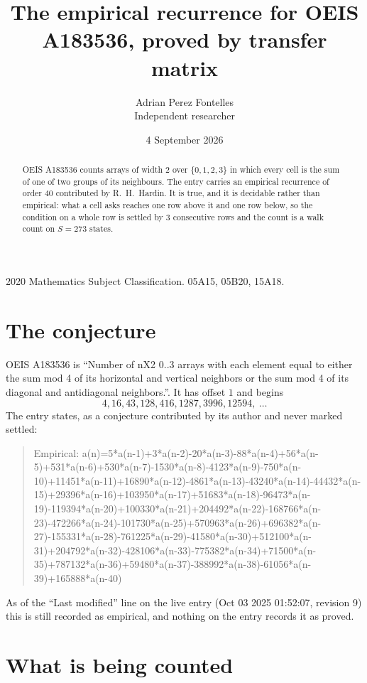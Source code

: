 \documentclass[11pt,a4paper]{article}
\title{The empirical recurrence for OEIS A183536, proved by transfer matrix}
\author{Adrian Perez Fontelles\\ \small Independent researcher}
\date{4 September 2026}
\theoremstyle{plain}
\theoremstyle{definition}
\begin{document}
\maketitle

\begin{abstract}
OEIS A183536 counts arrays of width $2$ over $\{0,1,2,3\}$ in which every cell is the sum of one of two groups of its neighbours. The entry carries an
empirical recurrence of order $40$ contributed by R.~H.~Hardin. It is true, and it is
decidable rather than empirical: what a cell asks reaches one row above
it and one row below, so the condition on a whole row is settled by
$3$ consecutive rows and the count is a walk count on $S=273$ states.
\end{abstract}

\noindent\small 2020 Mathematics Subject Classification. 05A15, 05B20, 15A18.\normalsize

\section{The conjecture}

OEIS A183536 is ``Number of nX2 0..3 arrays with each element equal to either the sum mod 4 of its horizontal and vertical neighbors or the sum mod 4 of its diagonal and antidiagonal neighbors.''. It has offset $1$ and begins
\[
4, 16, 43, 128, 416, 1287, 3996, 12594,\ \dots
\]
The entry states, as a conjecture contributed by its author and never marked settled:
\begin{quote}
Empirical: a(n)=5*a(n-1)+3*a(n-2)-20*a(n-3)-88*a(n-4)+56*a(n-5)+531*a(n-6)+530*a(n-7)-1530*a(n-8)-4123*a(n-9)-750*a(n-10)+11451*a(n-11)+16890*a(n-12)-4861*a(n-13)-43240*a(n-14)-44432*a(n-15)+29396*a(n-16)+103950*a(n-17)+51683*a(n-18)-96473*a(n-19)-119394*a(n-20)+100330*a(n-21)+204492*a(n-22)-168766*a(n-23)-472266*a(n-24)-101730*a(n-25)+570963*a(n-26)+696382*a(n-27)-155331*a(n-28)-761225*a(n-29)-41580*a(n-30)+512100*a(n-31)+204792*a(n-32)-428106*a(n-33)-775382*a(n-34)+71500*a(n-35)+787132*a(n-36)+59480*a(n-37)-388992*a(n-38)-61056*a(n-39)+165888*a(n-40)
\end{quote}
As of the ``Last modified'' line on the live entry (Oct 03 2025 01:52:07, revision 9) this is still
recorded as empirical, and nothing on the entry records it as proved.

\section{What is being counted}
\end{document}
